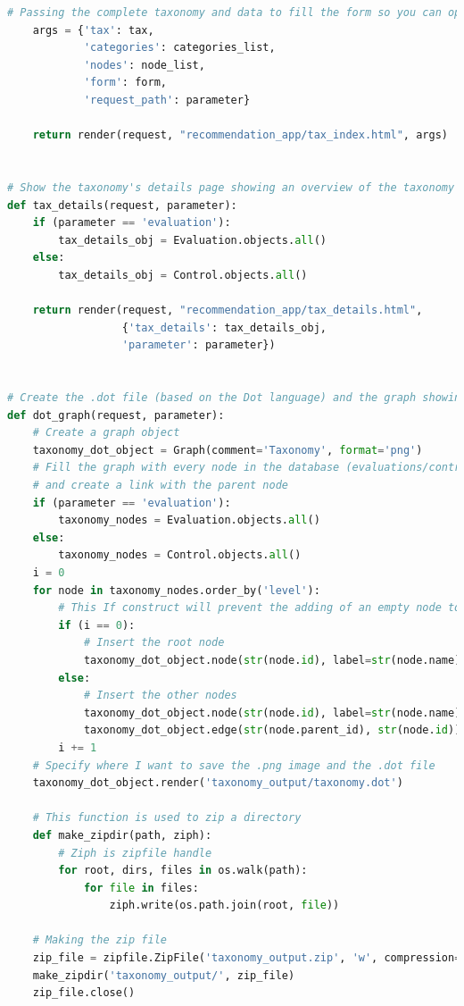 \begin{lstlisting}[language=Python, caption={Parti principali del codice delle View della soluzione per gestire la navigazione 
    delle tassonomie, quella delle Evaluation e quella dei Controlli}]
    # Passing the complete taxonomy and data to fill the form so you can operate on the taxonomy
    args = {'tax': tax,
            'categories': categories_list,
            'nodes': node_list,
            'form': form,
            'request_path': parameter}
 
    return render(request, "recommendation_app/tax_index.html", args)
 
 
# Show the taxonomy's details page showing an overview of the taxonomy
def tax_details(request, parameter):
    if (parameter == 'evaluation'):
        tax_details_obj = Evaluation.objects.all()
    else:
        tax_details_obj = Control.objects.all()
 
    return render(request, "recommendation_app/tax_details.html",
                  {'tax_details': tax_details_obj,
                  'parameter': parameter})
 
 
# Create the .dot file (based on the Dot language) and the graph showing the taxonomy in .png format
def dot_graph(request, parameter):
    # Create a graph object
    taxonomy_dot_object = Graph(comment='Taxonomy', format='png')
    # Fill the graph with every node in the database (evaluations/controls node and categories nodes), 
    # and create a link with the parent node
    if (parameter == 'evaluation'):
        taxonomy_nodes = Evaluation.objects.all()
    else:
        taxonomy_nodes = Control.objects.all()
    i = 0
    for node in taxonomy_nodes.order_by('level'):
        # This If construct will prevent the adding of an empty node to the root node in the graph
        if (i == 0):
            # Insert the root node
            taxonomy_dot_object.node(str(node.id), label=str(node.name))
        else:
            # Insert the other nodes
            taxonomy_dot_object.node(str(node.id), label=str(node.name))
            taxonomy_dot_object.edge(str(node.parent_id), str(node.id))
        i += 1
    # Specify where I want to save the .png image and the .dot file
    taxonomy_dot_object.render('taxonomy_output/taxonomy.dot')
 
    # This function is used to zip a directory
    def make_zipdir(path, ziph):
        # Ziph is zipfile handle
        for root, dirs, files in os.walk(path):
            for file in files:
                ziph.write(os.path.join(root, file))
 
    # Making the zip file
    zip_file = zipfile.ZipFile('taxonomy_output.zip', 'w', compression=zipfile.ZIP_DEFLATED)
    make_zipdir('taxonomy_output/', zip_file)
    zip_file.close()
 

\end{lstlisting}
